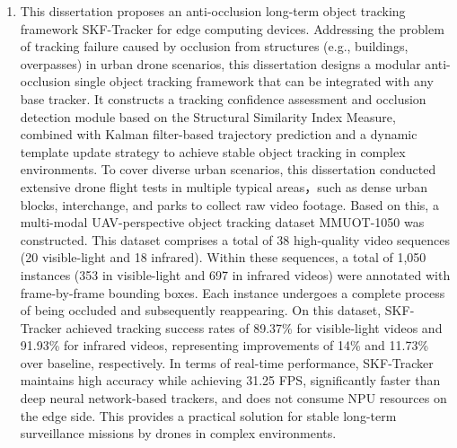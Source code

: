 \begin{englishabstract}
\begin{enumerate}[wide,leftmargin=0pt,itemsep=\baselineskip]
    \item This dissertation proposes an anti-occlusion long-term object tracking framework SKF-Tracker for edge computing devices. Addressing the problem of tracking failure caused by occlusion from structures (e.g., buildings, overpasses) in urban drone scenarios, this dissertation designs a modular anti-occlusion single object tracking framework that can be integrated with any base tracker. It constructs a tracking confidence assessment and occlusion detection module based on the Structural Similarity Index Measure, combined with Kalman filter-based trajectory prediction and a dynamic template update strategy to achieve stable object tracking in complex environments. To cover diverse urban scenarios, this dissertation conducted extensive drone flight tests in multiple typical areas，such as dense urban blocks, interchange, and parks to collect raw video footage. Based on this, a multi-modal UAV-perspective object tracking dataset MMUOT-1050 was constructed. This dataset comprises a total of 38 high-quality video sequences (20 visible-light and 18 infrared). Within these sequences, a total of 1,050 instances (353 in visible-light and 697 in infrared videos) were annotated with frame-by-frame bounding boxes. Each instance undergoes a complete process of being occluded and subsequently reappearing. On this dataset, SKF-Tracker achieved tracking success rates of 89.37\% for visible-light videos and 91.93\% for infrared videos, representing improvements of 14\% and 11.73\% over baseline, respectively. In terms of real-time performance, SKF-Tracker maintains high accuracy while achieving 31.25 FPS, significantly faster than deep neural network-based trackers, and does not consume NPU resources on the edge side. This provides a practical solution for stable long-term surveillance missions by drones in complex environments.
    

\end{enumerate}
\end{englishabstract}
